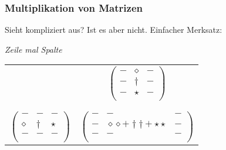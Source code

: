 \documentclass{beamer}
\begin{document}
\begin{frame}
  \frametitle{Multiplikation von Matrizen}
  Sieht kompliziert aus? Ist es aber nicht. Einfacher Merksatz:


  \begin{center}
    \huge
    \textit{Zeile mal Spalte}
  \end{center}
  \begin{center}
  \begin{tabular}{c|c}
    &$\begin{pmatrix}
      - & \diamond & - \\
      - & \dagger & - \\
      - & \star & - \\
    \end{pmatrix}$\\
    \\
    \hline
    \\
    $\begin{pmatrix}
      - & - & - \\
      \diamond & \dagger & \star \\
      - & - & - \\
    \end{pmatrix}$ & $\begin{pmatrix}
      - & - & - \\
      - &\diamond \diamond + \dagger \dagger +\star \star & - \\
      - & - & - \\
    \end{pmatrix}$  
  \end{tabular}
\end{center}
\end{frame}
\end{document}
